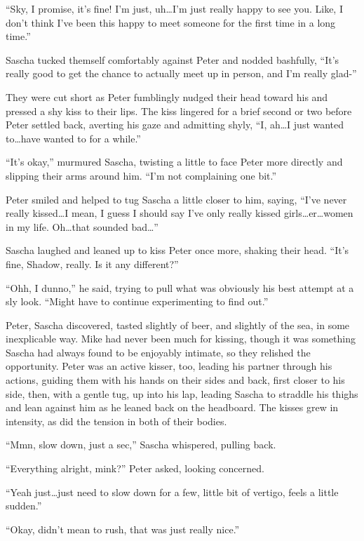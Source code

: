 ``Sky, I promise, it's fine! I'm just, uh\ldots{}I'm just really happy to see you. Like, I don't think I've been this happy to meet someone for the first time in a long time.''

Sascha tucked themself comfortably against Peter and nodded bashfully, ``It's really good to get the chance to actually meet up in person, and I'm really glad-''

They were cut short as Peter fumblingly nudged their head toward his and pressed a shy kiss to their lips. The kiss lingered for a brief second or two before Peter settled back, averting his gaze and admitting shyly, ``I, ah\ldots{}I just wanted to\ldots{}have wanted to for a while.''

``It's okay,'' murmured Sascha, twisting a little to face Peter more directly and slipping their arms around him. ``I'm not complaining one bit.''

Peter smiled and helped to tug Sascha a little closer to him, saying, ``I've never really kissed\ldots{}I mean, I guess I should say I've only really kissed girls\ldots{}er\ldots{}women in my life. Oh\ldots{}that sounded bad\ldots{}''

Sascha laughed and leaned up to kiss Peter once more, shaking their head. ``It's fine, Shadow, really. Is it any different?''

``Ohh, I dunno,'' he said, trying to pull what was obviously his best attempt at a sly look. ``Might have to continue experimenting to find out.''

Peter, Sascha discovered, tasted slightly of beer, and slightly of the sea, in some inexplicable way. Mike had never been much for kissing, though it was something Sascha had always found to be enjoyably intimate, so they relished the opportunity. Peter was an active kisser, too, leading his partner through his actions, guiding them with his hands on their sides and back, first closer to his side, then, with a gentle tug, up into his lap, leading Sascha to straddle his thighs and lean against him as he leaned back on the headboard. The kisses grew in intensity, as did the tension in both of their bodies.

``Mmn, slow down, just a sec,'' Sascha whispered, pulling back.

``Everything alright, mink?'' Peter asked, looking concerned.

``Yeah just\ldots{}just need to slow down for a few, little bit of vertigo, feels a little sudden.''

``Okay, didn't mean to rush, that was just really nice.''

